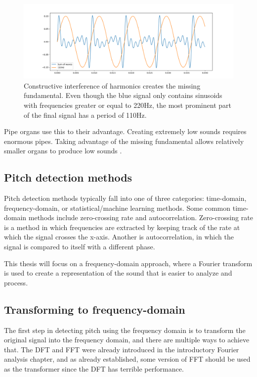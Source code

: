 \begin{figure}[ht]
    \centering
    \includegraphics[width=\textwidth]{./images/missingfund.png}
    \caption{Constructive interference of harmonics creates the missing fundamental. Even though the blue signal only contains sinusoids with frequencies greater or equal to 220Hz, the most prominent part of the final signal has a period of 110Hz. \label{fig:missingfund}}
\end{figure}

Pipe organs use this to their advantage. Creating extremely low sounds requires enormous pipes. Taking advantage of the missing fundamental allows relatively smaller organs to produce low sounds \cite{Veritasium2024}.

\subsection{Pitch detection methods}
Pitch detection methods typically fall into one of three categories: time-domain, frequency-domain, or statistical/machine learning methods. Some common time-domain methods include zero-crossing rate and autocorrelation. Zero-crossing rate is a method in which frequencies are extracted by keeping track of the rate at which the signal crosses the x-axis. Another is autocorrelation, in which the signal is compared to itself with a different phase. 

This thesis will focus on a frequency-domain approach, where a Fourier transform is used to create a representation of the sound that is easier to analyze and process.

\subsection{Transforming to frequency-domain}
The first step in detecting pitch using the frequency domain is to transform the original signal into the frequency domain, and there are multiple ways to achieve that. The DFT and FFT were already introduced in the introductory Fourier analysis chapter, and as already established, some version of FFT should be used as the transformer since the DFT has terrible performance. 


